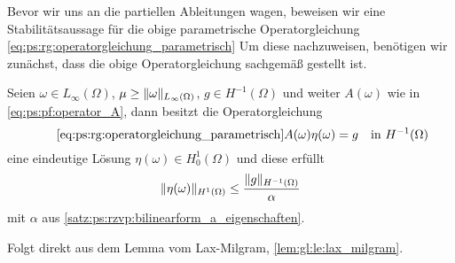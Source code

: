 Bevor wir uns an die partiellen Ableitungen wagen, beweisen wir eine Stabilitätsaussage für die obige parametrische Operatorgleichung \cref{eq:ps:rg:operatorgleichung_parametrisch}
Um diese nachzuweisen, benötigen wir zunächst, dass die obige Operatorgleichung sachgemäß gestellt ist.

\begin{Satz}
\label{satz:ps:rg:lax_milgram_anwendung}
    Seien $\omega \in L_{\infty}(\Omega)$, $\mu \geq \lVert\omega\rVert_{L_{\infty}(\Omega)}$, $g \in H^{-1}(\Omega)$ und weiter $A(\omega)$ wie in \cref{eq:ps:pf:operator_A}, dann besitzt die Operatorgleichung
    \begin{equation}
        \tag*{\cref{eq:ps:rg:operatorgleichung_parametrisch}}
        A(\omega) \eta(\omega) = g \quad \text{in}~H^{-1}(\Omega)
    \end{equation}
    eine eindeutige Lösung $\eta(\omega) \in H^{1}_{0}(\Omega)$ und diese erfüllt
    \begin{equation}
        \lVert\eta(\omega)\rVert_{H^{1}(\Omega)} \leq \frac{\lVert g\rVert_{H^{-1}(\Omega)}}{\alpha}
    \end{equation}
    mit $\alpha$ aus \cref{satz:ps:rzvp:bilinearform_a_eigenschaften}.

    \begin{Beweis}
        Folgt direkt aus dem Lemma vom Lax-Milgram, \cref{lem:gl:le:lax_milgram}.
    \end{Beweis}
\end{Satz}


